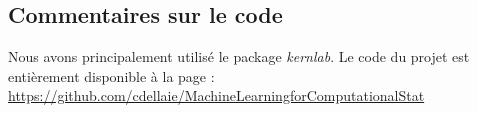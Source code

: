 \documentclass{article}
\begin{document}
\subsection{Commentaires sur le code}
Nous avons principalement utilisé le package \textit{kernlab}.
Le code du projet est entièrement disponible à la page :\\

\url{https://github.com/cdellaie/MachineLearningforComputationalStat}








 
\end{document}
